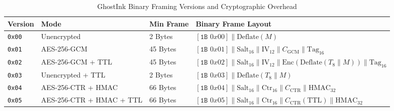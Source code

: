 \documentclass[12pt,a4paper,oneside,openany]{report}
\begin{document}
\begin{table}[H]
\centering
\small
\caption{GhostInk Binary Framing Versions and Cryptographic Overhead}
\label{tab:frame_versions}
\begin{tabularx}{\textwidth}{p{1.4cm}p{3.6cm}p{2.2cm}X}
\toprule
\textbf{Version} & \textbf{Mode} & \textbf{Min Frame} & \textbf{Binary Frame Layout} \\
\midrule
\texttt{0x00} & Unencrypted & 2 Bytes & $[\texttt{1B } 0x00] \parallel \text{Deflate}(M)$ \\
\texttt{0x01} & AES-256-GCM & 45 Bytes & $[\texttt{1B } 0x01] \parallel \text{Salt}_{16} \parallel \text{IV}_{12} \parallel C_{\text{GCM}} \parallel \text{Tag}_{16}$ \\
\texttt{0x02} & AES-256-GCM + TTL & 45 Bytes & $[\texttt{1B } 0x02] \parallel \text{Salt}_{16} \parallel \text{IV}_{12} \parallel \text{Enc}(\text{Deflate}(T_8 \parallel M)) \parallel \text{Tag}_{16}$ \\
\texttt{0x03} & Unencrypted + TTL & 2 Bytes & $[\texttt{1B } 0x03] \parallel \text{Deflate}(T_8 \parallel M)$ \\
\texttt{0x04} & AES-256-CTR + HMAC & 66 Bytes & $[\texttt{1B } 0x04] \parallel \text{Salt}_{16} \parallel \text{Ctr}_{16} \parallel C_{\text{CTR}} \parallel \text{HMAC}_{32}$ \\
\texttt{0x05} & AES-256-CTR + HMAC + TTL & 66 Bytes & $[\texttt{1B } 0x05] \parallel \text{Salt}_{16} \parallel \text{Ctr}_{16} \parallel C_{\text{CTR}}(\text{TTL}) \parallel \text{HMAC}_{32}$ \\
\bottomrule
\end{tabularx}
\end{table}
\end{document}
